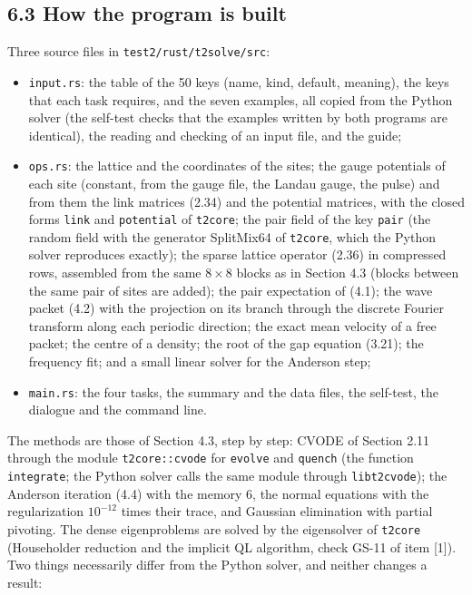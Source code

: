 \documentclass[
  10pt,
]{article}
\providecommand{\tightlist}{%
  \setlength{\itemsep}{0pt}\setlength{\parskip}{0pt}}
\begin{document}
\hypertarget{how-the-program-is-built}{%
\subsection{6.3 How the program is
built}\label{how-the-program-is-built}}

Three source files in \texttt{test2/rust/t2solve/src}:

\begin{itemize}
\tightlist
\item
  \texttt{input.rs}: the table of the 50 keys (name, kind, default,
  meaning), the keys that each task requires, and the seven examples,
  all copied from the Python solver (the self-test checks that the
  examples written by both programs are identical), the reading and
  checking of an input file, and the guide;
\item
  \texttt{ops.rs}: the lattice and the coordinates of the sites; the
  gauge potentials of each site (constant, from the gauge file, the
  Landau gauge, the pulse) and from them the link matrices (2.34) and
  the potential matrices, with the closed forms \texttt{link} and
  \texttt{potential} of \texttt{t2core}; the pair field of the key
  \texttt{pair} (the random field with the generator SplitMix64 of
  \texttt{t2core}, which the Python solver reproduces exactly); the
  sparse lattice operator (2.36) in compressed rows, assembled from the
  same \(8\times8\) blocks as in Section 4.3 (blocks between the same
  pair of sites are added); the pair expectation of (4.1); the wave
  packet (4.2) with the projection on its branch through the discrete
  Fourier transform along each periodic direction; the exact mean
  velocity of a free packet; the centre of a density; the root of the
  gap equation (3.21); the frequency fit; and a small linear solver for
  the Anderson step;
\item
  \texttt{main.rs}: the four tasks, the summary and the data files, the
  self-test, the dialogue and the command line.
\end{itemize}

The methods are those of Section 4.3, step by step: CVODE of Section
2.11 through the module \texttt{t2core::cvode} for \texttt{evolve} and
\texttt{quench} (the function \texttt{integrate}; the Python solver
calls the same module through \texttt{libt2cvode}); the Anderson
iteration (4.4) with the memory 6, the normal equations with the
regularization \(10^{-12}\) times their trace, and Gaussian elimination
with partial pivoting. The dense eigenproblems are solved by the
eigensolver of \texttt{t2core} (Householder reduction and the implicit
QL algorithm, check GS-11 of item {[}1{]}). Two things necessarily
differ from the Python solver, and neither changes a result:
\end{document}
